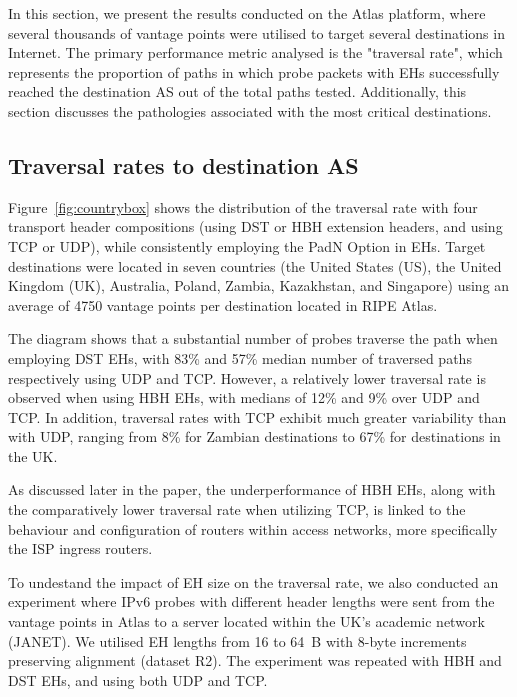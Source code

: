 \documentclass[conference]{IEEEtran}
\begin{document}
In this section, we present the results conducted on the Atlas platform, where
several thousands of vantage points were utilised to target several destinations
in Internet. The primary performance metric analysed is the "traversal rate",
which represents the proportion of paths in which probe packets with EHs
successfully reached the destination AS out of the total paths tested.
Additionally, this section discusses the pathologies associated with the most
critical destinations.

\subsection{Traversal rates to destination AS}


Figure~\ref{fig:countrybox} shows the distribution of the traversal rate with
four transport header compositions (using DST or HBH extension headers, and
using TCP or UDP), while consistently employing the PadN Option in EHs.  Target
destinations were located in seven countries (the United States (US), the
United Kingdom (UK), Australia, Poland, Zambia, Kazakhstan, and Singapore) using
an average of 4750 vantage points per destination located in RIPE Atlas.

The diagram shows that a substantial number of probes traverse the path when
employing DST EHs, with 83\% and 57\% median number of traversed paths
respectively using UDP and TCP.  However, a relatively lower traversal rate is
observed when using HBH EHs, with medians of 12\% and 9\% over UDP and TCP. In
addition, traversal rates with TCP exhibit much greater variability than with
UDP, ranging from 8\% for Zambian destinations to 67\% for destinations in the
UK.

As discussed later in the paper, the underperformance of HBH EHs, along with
the comparatively lower traversal rate when utilizing TCP, is linked to the
behaviour and configuration of routers within access networks, more
specifically the ISP ingress routers.

To undestand the impact of EH size on the traversal rate, we also conducted an
experiment where IPv6 probes with different header lengths were sent from the
vantage points in Atlas to a server located within the UK's academic network
(JANET).  We utilised EH lengths from 16 to 64~B with 8-byte
increments preserving alignment (dataset R2). The experiment was repeated with
HBH and DST EHs, and using both UDP and TCP.
\end{document}
